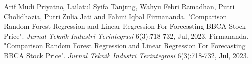 \begin{thebibliography}{00}
 Arif Mudi Priyatno, Lailatul Syifa Tanjung, Wahyu Febri Ramadhan, Putri Cholidhazia, Putri Zulia Jati and Fahmi Iqbal Firmananda. "Comparison Random Forest Regression and Linear Regression For Forecasting BBCA Stock Price". \textit{Jurnal Teknik Industri Terintegrasi} 6(3):718-732, Jul, 2023.
  Firmananda. "Comparison Random Forest Regression and Linear Regression For Forecasting BBCA Stock Price". \textit{Jurnal Teknik Industri Terintegrasi} 6(3):718-732, Jul, 2023.

\end{thebibliography}
